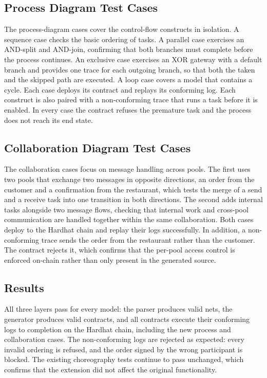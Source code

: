 \documentclass[runningheads]{llncs}
\begin{document}
\subsection{Process Diagram Test Cases}
The process-diagram cases cover the control-flow constructs in isolation. A sequence case checks the basic ordering of tasks. A parallel case exercises an AND-split and AND-join, confirming that both branches must complete before the process continues. An exclusive case exercises an XOR gateway with a default branch and provides one trace for each outgoing branch, so that both the taken and the skipped path are executed. A loop case covers a model that contains a cycle. Each case deploys its contract and replays its conforming log. Each construct is also paired with a non-conforming trace that runs a task before it is enabled. In every case the contract refuses the premature task and the process does not reach its end state.

\subsection{Collaboration Diagram Test Cases}
The collaboration cases focus on message handling across pools. The first uses two pools that exchange two messages in opposite directions, an order from the customer and a confirmation from the restaurant, which tests the merge of a send and a receive task into one transition in both directions. The second adds internal tasks alongside two message flows, checking that internal work and cross-pool communication are handled together within the same collaboration. Both cases deploy to the Hardhat chain and replay their logs successfully. In addition, a non-conforming trace sends the order from the restaurant rather than the customer. The contract rejects it, which confirms that the per-pool access control is enforced on-chain rather than only present in the generated source.

\subsection{Results}
All three layers pass for every model: the parser produces valid nets, the generator produces valid contracts, and all contracts execute their conforming logs to completion on the Hardhat chain, including the new process and collaboration cases. The non-conforming logs are rejected as expected: every invalid ordering is refused, and the order signed by the wrong participant is blocked. The existing choreography tests continue to pass unchanged, which confirms that the extension did not affect the original functionality. 
\end{document}
